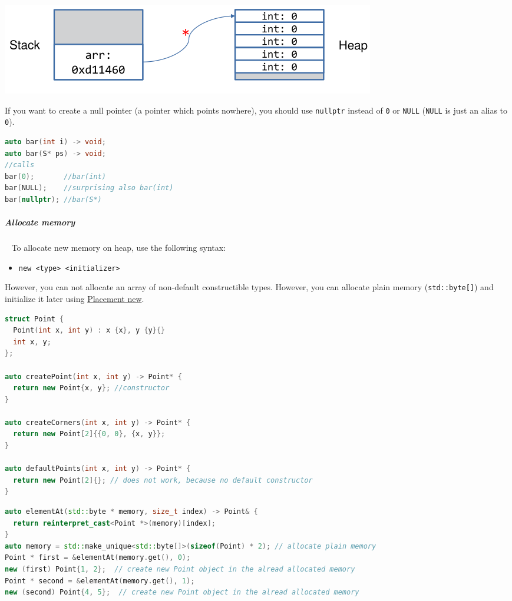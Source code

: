\documentclass[11pt,twoside,landscape]{article}
\begin{document}
\begin{multicols}{2}
{
\begin{center}
\includegraphics[width=.9\linewidth]{img/pointer_to_array.png}
\end{center}
\label{fig:pointer-to-array}
}

If you want to create a null pointer (a pointer which points nowhere), you should use \texttt{nullptr} instead of \texttt{0} or \texttt{NULL} (\texttt{NULL} is just an alias to \texttt{0}).

\begin{lstlisting}[language=c++,numbers=none]
auto bar(int i) -> void;
auto bar(S* ps) -> void;
//calls
bar(0);       //bar(int)
bar(NULL);    //surprising also bar(int)
bar(nullptr); //bar(S*)
\end{lstlisting}

\subparagraph{Allocate memory} \
\label{sec:orgf288cc0}
To allocate new memory on heap, use the following syntax:
\begin{itemize}
\item \texttt{new <type> <initializer>}
\end{itemize}


However, you can not allocate an array of non-default constructible types.
However, you can allocate plain memory (\texttt{std::byte[]}) and initialize it later using \href{../../../roam/20230622180239-what_is_placement_new_in_cpp.org}{Placement new}.

\begin{lstlisting}[language=c++,label=lst:allocate-new-memory-on-heap,caption={Allocate new memory on heap},captionpos=b,numbers=none]
struct Point {
  Point(int x, int y) : x {x}, y {y}{}
  int x, y;
};

auto createPoint(int x, int y) -> Point* {
  return new Point{x, y}; //constructor
}

auto createCorners(int x, int y) -> Point* {
  return new Point[2]{{0, 0}, {x, y}};
}

auto defaultPoints(int x, int y) -> Point* {
  return new Point[2]{}; // does not work, because no default constructor
}
\end{lstlisting}

\begin{lstlisting}[language=c++,label=lst:example-for-a-non-default-constructible-type-on-the-heap,caption={Example for a non default constructible type on the heap},captionpos=b,numbers=none]
auto elementAt(std::byte * memory, size_t index) -> Point& {
  return reinterpret_cast<Point *>(memory)[index];
}
auto memory = std::make_unique<std::byte[]>(sizeof(Point) * 2); // allocate plain memory
Point * first = &elementAt(memory.get(), 0);
new (first) Point{1, 2};  // create new Point object in the alread allocated memory
Point * second = &elementAt(memory.get(), 1);
new (second) Point{4, 5};  // create new Point object in the alread allocated memory


\end{lstlisting}
\end{multicols}
\end{document}
